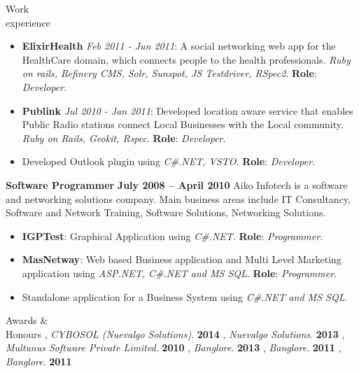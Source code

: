 \documentclass{resume}
\begin{document}
\begin{category}{Work \\experience}
\begin{itemize}
  \item \textbf{ElixirHealth} {\em Feb 2011 - Jun 2011}: A social networking web app for the HealthCare
    domain, which connects people to the health professionals. {\em
      Ruby on rails, Refinery CMS, Solr, Sunspot, JS Testdriver,
      RSpec2}. \textbf{Role}: {\em Developer}.
  \item \textbf{Publink} {\em Jul 2010 - Jan 2011}: Developed location aware service that enables Public Radio
    stations connect Local Businesses with the Local community. {\em Ruby on Rails, Geokit, Rspec}. \textbf{Role}: {\em Developer}.
  \item Developed Outlook plugin using {\em C\#.NET, VSTO}. \textbf{Role}: {\em Developer}.
  \end{itemize}
  \citemnobullet \textbf{Software Programmer} \hfill \textbf{July 2008 -- April 2010}
  \citemnobullet Aiko Infotech is a software and networking solutions
  company. Main business areas include IT Consultancy, Software and Network
  Training, Software Solutions, Networking Solutions.
  \begin{itemize} 
  \item \textbf{IGPTest}: Graphical Application using {\em C\#.NET}. \textbf{Role}: {\em Programmer}.
  \item \textbf{MasNetway}: Web based Business application and Multi Level Marketing
    application using {\em ASP.NET, C\#.NET and MS SQL}. \textbf{Role}: {\em Programmer}.
  \item Standalone application for a Business System using {\em C\#.NET and MS SQL}.
  \end{itemize}
\end{category}


\begin{category}{Awards \&\\ Honours}
  , {\em
    CYBOSOL (Nuevalgo Solutions)}. \hfill \textbf{2014}
  , {\em Nuevalgo Solutions}. \hfill \textbf{2013}
  , {\em Multunus Software Private Limited}. \hfill \textbf{2010}
  , {\em Banglore}. \hfill \textbf{2013}
  , {\em Banglore}. \hfill \textbf{2011}
  , {\em Banglore}. \hfill \textbf{2011}
\end{category}
\end{document}

